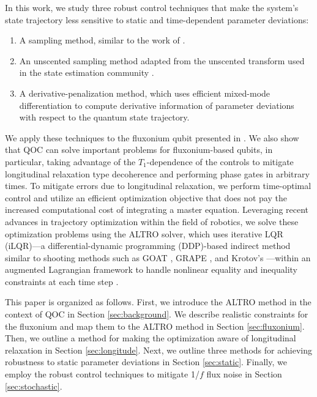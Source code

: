 In this work, we study three robust control techniques that
make the system's state trajectory less sensitive
to static and time-dependent parameter deviations:
\begin{enumerate}
  \item A sampling method, similar to the work of \cite{allen2019robust,
    carvalho2020error, reinhold2019controlling, rembold2020introduction}.
  \item An unscented sampling method adapted from the unscented transform used in the 
    state estimation community \cite{howell2020direct, julier2004unscented,
      lee2013sigma, manchester2016derivative}.
  \item A derivative-penalization method, which uses efficient mixed-mode differentiation
    to compute derivative information of parameter deviations with respect to the 
    quantum state trajectory.
\end{enumerate}
We apply these techniques to the fluxonium qubit presented in \cite{zhang2020universal}.
We also show that QOC can solve important problems for fluxonium-based qubits,
in particular, taking advantage of the $T_{1}$-dependence of the controls
to mitigate longitudinal relaxation type decoherence and
performing phase gates in arbitrary times.
To mitigate errors due to longitudinal
relaxation, we perform time-optimal control and
utilize an efficient optimization objective that does
not pay the increased computational cost of integrating a master equation.
Leveraging recent advances in trajectory optimization within the field of robotics, we
solve these optimization problems using the ALTRO solver, which uses iterative LQR 
(iLQR)---a differential-dynamic programming (DDP)-based indirect method similar to shooting
methods such as GOAT \cite{machnes2015gradient}, GRAPE
\cite{khaneja2005optimal, leung2017speedup}, and Krotov's \cite{goerz2019krotov}---within 
an augmented Lagrangian framework to handle nonlinear equality and inequality constraints at 
each time step \cite{howell2019altro}. 

This paper is organized as follows.
First, we introduce the ALTRO method in the context of QOC
in Section \ref{sec:background}.
We describe realistic constraints for the fluxonium and
map them to the ALTRO method in Section \ref{sec:fluxonium}. Then, we
outline a method for making the optimization aware of longitudinal
relaxation in Section \ref{sec:longitude}. Next, we outline three methods for achieving
robustness to static parameter deviations in Section \ref{sec:static}. Finally,
we employ the robust control techniques to mitigate 1/$f$ flux noise
in Section \ref{sec:stochastic}.

